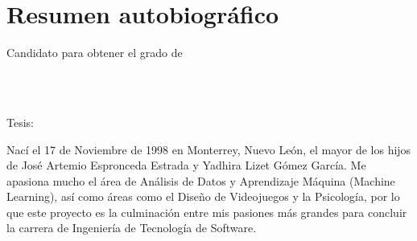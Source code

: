 
\chapter*{Resumen autobiográfico}
\thispagestyle{empty}

\begin{center}
\autor

Candidato para obtener el grado de\\
\grado\\
\orientacion\bigskip

\uanl\\
\fime\bigskip

Tesis:\\
\textsc{\large\titulo}
\end{center}\bigskip

Nací el 17 de Noviembre de 1998 en Monterrey, Nuevo León, el mayor de los hijos de José Artemio Espronceda Estrada y Yadhira Lizet Gómez García. Me apasiona mucho el área de Análisis de Datos y Aprendizaje Máquina (Machine Learning), así como áreas como el Diseño de Videojuegos y la Psicología, por lo que este proyecto es la culminación entre mis pasiones más grandes para concluir la carrera de Ingeniería de Tecnología de Software.